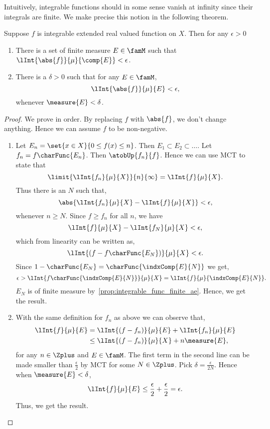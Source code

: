 Intuitively, integrable functions should in some sense vanish at infinity since their integrals are finite. We
make precise this notion in the following theorem.
\begin{Theorem}[name=Absolute continuity]\label{thm:abs_cont_integral}
    Suppose $f$ is integrable extended real valued function on $X$. Then for any $\epsilon > 0$
    \begin{enumerate}
	\item
	    There is a set of finite measure $E\in\famM$ such that $\lInt{\abs{f}}{\mu}{\comp{E}} < \epsilon$.
	\item
	    There is a $\delta > 0$ such that for any $E \in \famM$,
	    \[\lInt{\abs{f}}{\mu}{E} < \epsilon,\]
	    whenever $\measure{E} < \delta$.
    \end{enumerate}
\end{Theorem}
\begin{proof}
    We prove in order. By replacing $f$ with $\abs{f}$, we don't change anything. Hence we can assume $f$ to
    be non-negative.
    \begin{enumerate}
	\item
	    Let $E_n = \set{x\in X}{0\leq f(x) \leq n}$. Then $E_1 \subset E_2 \subset \ldots$. Let 
	    $f_n = f\charFunc{E_n}$. Then $\atobUp{f_n}{f}$. Hence we can use MCT to state that
	    \[\limit{\lInt{f_n}{\mu}{X}}{n}{\infty} = \lInt{f}{\mu}{X}.\]
	    Thus there is an $N$ such that,
	    \[\abs{\lInt{f_n}{\mu}{X} - \lInt{f}{\mu}{X}} < \epsilon,\]
	    whenever $n \geq N$. Since $f \geq f_n$ for all $n$, we have
	    \[\lInt{f}{\mu}{X} - \lInt{f_N}{\mu}{X} < \epsilon,\]
	    which from linearity can be written as,
	    \[\lInt{(f - f\charFunc{E_N})}{\mu}{X} < \epsilon.\]
	    Since $1-\charFunc{E_N} = \charFunc{\indxComp{E}{N}}$ we get,
	    \[\epsilon > \lInt{f\charFunc{\indxComp{E}{N}}}{\mu}{X} =
		\lInt{f}{\mu}{\indxComp{E}{N}}.\]
	    $E_N$ is of finite measure by~\ref{prop:integrable_func_finite_ae}.
	    Hence, we get the result.
	\item
	    With the same definition for $f_n$ as above we can observe that,
	    \begin{align*}
		\lInt{f}{\mu}{E} &= \lInt{(f-f_n)}{\mu}{E} + \lInt{f_n}{\mu}{E} \\
		& \leq \lInt{(f-f_n)}{\mu}{X} + n\measure{E},
	    \end{align*}
	    for any $n\in\Zplus$ and $E \in \famM$.
	    The first term in the second line can be made smaller than $\frac{\epsilon}{2}$ by MCT for some
	    $N\in\Zplus$. Pick $\delta = \frac{\epsilon}{2N}$. Hence when $\measure{E} < \delta$,
	    \[\lInt{f}{\mu}{E} \leq \frac{\epsilon}{2} + \frac{\epsilon}{2} = \epsilon.\]
	    Thus, we get the result.
    \end{enumerate}
\end{proof}
